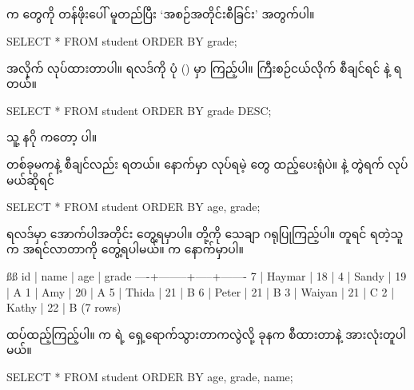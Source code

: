 \subsection*{}
 က  တွေကို  တန်ဖိုးပေါ် မူတည်ပြီး ‘အစဉ်အတိုင်းစီခြင်း’  အတွက်ပါ။
%
\begin{sql}
SELECT * FROM student ORDER BY grade;
\end{sql}
%
 အလိုက်  လုပ်ထားတာပါ။ ရလဒ်ကို ပုံ (\fRefNo{\ref{fig:orderbyasc}}) မှာ ကြည့်ပါ။ ကြီးစဉ်ငယ်လိုက် စီချင်ရင်   နဲ့ ရတယ်။
\begin{figure}[tbh!]
\caption{} 
\label{fig:orderbyasc}
\end{figure}
%
\begin{sql}
SELECT * FROM student ORDER BY grade DESC;
\end{sql}
%
သူ့ နဂို  ကတော့   ပါ။ 

 တစ်ခုမကနဲ့  စီချင်လည်း ရတယ်။  နောက်မှာ  လုပ်ရမဲ့  တွေ ထည့်ပေးရုံပဲ။  နဲ့  တွဲရက်  လုပ်မယ်ဆိုရင်
%
\begin{sql}
SELECT * FROM student ORDER BY age, grade;
\end{sql}
%
 ရလဒ်မှာ အောက်ပါအတိုင်း တွေ့ရမှာပါ။  တို့ကို သေချာ ဂရုပြုကြည့်ပါ။  တူရင်  ရတဲ့သူက အရင်လာတာကို တွေ့ရပါမယ်။  က နောက်မှာပါ။
\begin{vbtm}
ßß
 id |  name  | age | grade
----+--------+-----+-------
  7 | Haymar |  18 |
  4 | Sandy  |  19 | A
  1 | Amy    |  20 | A
  5 | Thida  |  21 | B
  6 | Peter  |  21 | B
  3 | Waiyan |  21 | C
  2 | Kathy  |  22 | B
(7 rows)
\end{vbtm}
 ထပ်ထည့်ကြည့်ပါ။   က  ရဲ့ ရှေ့ရောက်သွားတာကလွဲလို့ ခုနက စီထားတာနဲ့ အားလုံးတူပါမယ်။
%
\begin{sql}
SELECT * FROM student ORDER BY age, grade, name;
\end{sql}
%

